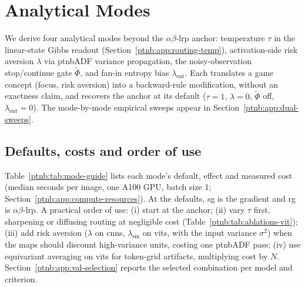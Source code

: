 \section{Analytical Modes}\label{ptnb:app:modes}

We derive four analytical modes beyond the $\alpha\beta$-\ac{lrp} anchor: temperature $\tau$ in
the linear-state Gibbs readout (Section~\ref{ptnb:app:routing-temp}), activation-side risk aversion
$\lambda$ via \ac{ptnbADF} variance propagation, the noisy-observation stop/continue gate
$\tilde\Phi$, and fan-in entropy bias $\lambda_{\mathrm{ent}}$. Each translates a game concept
(focus, risk aversion) into a backward-rule modification, without an exactness claim, and recovers the anchor at its default
($\tau = 1$, $\lambda = 0$, $\tilde\Phi$ off, $\lambda_{\mathrm{ent}} = 0$). The mode-by-mode
empirical sweeps appear in Section~\ref{ptnb:app:dual-sweeps}.

\subsection{Defaults, costs and order of use}\label{ptnb:app:mode-guide}

Table~\ref{ptnb:tab:mode-guide} lists each mode's default, effect and measured cost
(median seconds per image, one A100 GPU, batch size 1; Section~\ref{ptnb:app:compute-resources}). At
the defaults, \ac{sg} is the gradient and \ac{rg} is $\alpha\beta$-\ac{lrp}. A practical order of
use: (i) start at the anchor; (ii) vary $\tau$ first, sharpening or diffusing routing at negligible cost
(Table~\ref{ptnb:tab:ablations-vit}); (iii) add risk aversion ($\lambda$ on
\acp{cnn}, $\lambda_{\mathrm{sm}}$ on \acp{vit}, with the input variance $\sigma^2$) when the maps
should discount high-variance units, costing one \ac{ptnbADF} pass; (iv) use
equivariant averaging on \acp{vit} for token-grid artifacts, multiplying cost by $N$.
Section~\ref{ptnb:app:val-selection} reports the selected combination per model and criterion.

